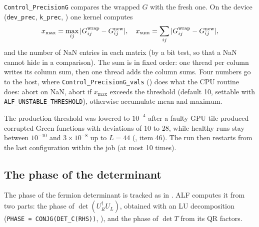\texttt{Control\_PrecisionG} compares the wrapped $G$ with the fresh one. On the device (\texttt{dev\_prec}, \texttt{k\_prec}, ) one kernel computes
\begin{equation}
x_{\max}=\max_{ij}|G^{\rm wrap}_{ij}-G^{\rm new}_{ij}|,\quad x_{\rm sum}=\sum_{ij}|G^{\rm wrap}_{ij}-G^{\rm new}_{ij}|,
\end{equation}
and the number of NaN entries in each matrix (by a bit test, so that a NaN cannot hide in a comparison). The sum is in fixed order: one thread per column writes its column sum, then one thread adds the column sums. Four numbers go to the host, where \texttt{Control\_PrecisionG\_vals} () does what the CPU routine does: abort on NaN, abort if $x_{\max}$ exceeds the threshold (default 10, settable with \texttt{ALF\_UNSTABLE\_THRESHOLD}), otherwise accumulate mean and maximum.

The production threshold was lowered to $10^{-4}$ after a faulty GPU tile produced corrupted Green functions with deviations of 10 to 28, while healthy runs stay between $10^{-10}$ and $3\times10^{-8}$ up to $L=44$ (, item 46). %
The run then restarts from the last configuration within the job (at most 10 times).

\subsection{The phase of the determinant}

The phase of the fermion determinant is tracked as in . ALF computes it from two parts: the phase of $\det(U_R^\dagger U_L)$, obtained with an LU decomposition (\texttt{PHASE = CONJG(DET\_C(RHS))}, ), and the phase of $\det T$ from its QR factors.

